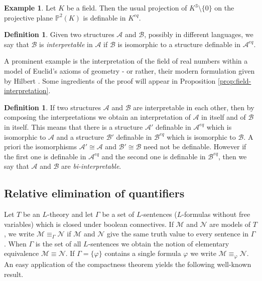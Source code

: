 \documentclass{amsart}
\newcommand{\ca}{\mathcal}
\theoremstyle{plain}
\theoremstyle{definition}
\newtheorem{defn}[thm]{Definition}
\newtheorem{exa}[thm]{Example}
\begin{document}
\begin{exa}
Let $K$ be a field. Then the usual projection of $K^3 \setminus \{0\}$ on the projective plane $\mathbb P^2(K)$ is definable in $K^{eq}$. 
\end{exa}

\begin{defn}
Given two structures $\ca A$ and $\ca B$, possibly in different languages, we say that $\ca B$ is {\em interpretable} in $\ca A$ if $\ca B$ is isomorphic to a structure definable in $\ca A^{eq}$.
\end{defn}

A prominent example is the interpretation of the field of real numbers within a model of Euclid's axioms of geometry - or rather, their modern formulation given by Hilbert \cite{Hilbert}. Some ingredients of the proof will appear in Proposition \ref{prop:field-interpretation}.


   
\begin{defn}\label{defn:biinterpretable}
If two structures $\ca A$ and $\ca B$ are interpretable in each other, then by composing the interpretations we obtain an interpretation of $\ca A$ in itself and of $\ca B$ in itself. This means that there is a structure $\ca A'$ definable in $\ca A^{eq}$ which is isomorphic to $\ca A$ and a structure $\ca B'$ definable in $\ca B^{eq}$ which is isomorphic to $\ca B$. A priori the isomorphisms $\ca A' \cong \ca A$ and $\ca B' \cong \ca B$ need not be definable. However if the first one is definable in $\ca A^{eq}$ and the second one is definable in $\ca B^{eq}$, then we say that $\ca A$ and $\ca B$ are \emph{bi-interpretable}. 
\end{defn} 

\subsection{Relative elimination of quantifiers}
Let $T$ be an $L$-theory and let $\Gamma$ be a set of $L$-sentences ($L$-formulas without free variables) which is closed under boolean connectives. If $\ca M$ and $\ca N$ are models of $T$, we write $\ca M\equiv_{\Gamma} \ca N$ if $\ca M$ and $\ca N$ give the same truth value to every sentence in $\Gamma$. 
When $\Gamma$ is the set of all $L$-sentences we obtain the notion of elementary equivalence $\ca M\equiv \ca N$. If $\Gamma = \{\varphi\}$ contains a single formula $\varphi$ we write $\ca M \equiv_\varphi \ca N$. An easy application of the compactness theorem yields the following well-known result. 
\end{document}
